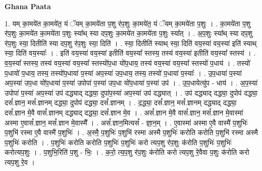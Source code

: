\documentclass[17pt]{extarticle}
\begin{document}
\textbf{Ghana Paata } \newline

1. यम् का॒मये॑त का॒मये॑त॒ यं ॅयम् का॒मये॑ता प॒शु र॑प॒शुः का॒मये॑त॒ यं ॅयम् का॒मये॑ता प॒शुः । . का॒मये॑ता प॒शु र॑प॒शुः का॒मये॑त का॒मये॑ता प॒शुः स्या᳚थ् स्या दप॒शुः का॒मये॑त का॒मये॑ता प॒शुः स्या᳚त् । . अ॒प॒शुः स्या᳚थ् स्या दप॒शु र॑प॒शुः स्या॒ दितीति॑ स्या दप॒शु र॑प॒शुः स्या॒ दिति॑ । . स्या॒ दितीति॑ स्याथ् स्या॒ दिति॑ वय॒स्या॑ वय॒स्या॑ इति॑ स्याथ् स्या॒ दिति॑ वय॒स्याः᳚ । . इति॑ वय॒स्या॑ वय॒स्या॑ इतीति॑ वय॒स्या᳚ स्तस्य॒ तस्य॑ वय॒स्या॑ इतीति॑ वय॒स्या᳚ स्तस्य॑ । . व॒य॒स्या᳚ स्तस्य॒ तस्य॑ वय॒स्या॑ वय॒स्या᳚ स्तस्यो॑प॒धा यो॑प॒धाय॒ तस्य॑ वय॒स्या॑ वय॒स्या᳚ स्तस्यो॑ प॒धाय॑ । . तस्यो॑ प॒धायो॑ प॒धाय॒ तस्य॒ तस्यो॑प॒धाया॑ प॒स्या॑ अप॒स्या॑ उप॒धाय॒ तस्य॒ तस्यो॑ प॒धाया॑ प॒स्याः᳚ । . उ॒प॒धाया॑ प॒स्या॑ अप॒स्या॑ उप॒धा यो॑प॒धाया॑ प॒स्या॑ उपोपा॑ प॒स्या॑ उप॒धा यो॑प॒धाया॑ प॒स्या॑ उप॑ । . उ॒प॒धायेत्यु॑प - धाय॑ । . अ॒प॒स्या॑ उपोपा॑ प॒स्या॑ अप॒स्या॑ उप॑ दद्ध्याद् दद्ध्या॒ दुपा॑प॒स्या॑ अप॒स्या॑ उप॑ दद्ध्यात् । . उप॑ दद्ध्याद् दद्ध्या॒ दुपोप॑ दद्ध्या॒ दसं᳚.ज्ञान॒ मसं᳚.ज्ञानम् दद्ध्या॒ दुपोप॑ दद्ध्या॒ 
दसं᳚.ज्ञानम् । . द॒द्ध्या॒ दसं᳚.ज्ञान॒ मसं᳚.ज्ञानम् दद्ध्याद् दद्ध्या॒ दसं᳚.ज्ञान मे॒वै वासं᳚.ज्ञानम् दद्ध्याद् दद्ध्या॒ दसं᳚.ज्ञान मे॒व । . असं᳚.ज्ञान मे॒वै वासं᳚.ज्ञान॒ मसं᳚.ज्ञान मे॒वास्मा॑ अस्मा ए॒वासं᳚.ज्ञान॒ मसं᳚.ज्ञान मे॒वास्मै᳚ । . असं᳚.ज्ञान॒मित्यसं᳚ - ज्ञा॒न॒म् । . ए॒वास्मा॑ अस्मा ए॒वै वास्मै॑ प॒शुभिः॑ प॒शुभि॑ रस्मा ए॒वै वास्मै॑ प॒शुभिः॑ । . अ॒स्मै॒ प॒शुभिः॑ प॒शुभि॑ रस्मा अस्मै प॒शुभिः॑ करोति करोति प॒शुभि॑ रस्मा अस्मै प॒शुभिः॑ करोति । . प॒शुभिः॑ करोति करोति प॒शुभिः॑ प॒शुभिः॑ करो त्यप॒शु र॑प॒शुः क॑रोति प॒शुभिः॑ प॒शुभिः॑ करोत्यप॒शुः । . प॒शुभि॒रिति॑ प॒शु - भिः॒ । . क॒रो॒ त्य॒प॒शु र॑प॒शुः क॑रोति करो त्यप॒शु रे॒वैवा प॒शुः क॑रोति करो त्यप॒शु रे॒व । \newline
\end{document}
